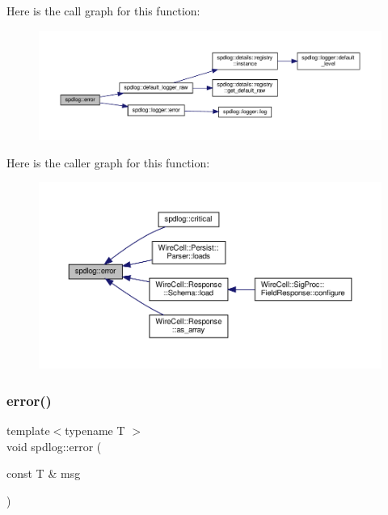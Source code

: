 Here is the call graph for this function\+:
\nopagebreak
\begin{figure}[H]
\begin{center}
\leavevmode
\includegraphics[width=350pt]{namespacespdlog_a84fc1d0e60ec7d333fd4f299f9c1e6b2_cgraph}
\end{center}
\end{figure}
Here is the caller graph for this function\+:
\nopagebreak
\begin{figure}[H]
\begin{center}
\leavevmode
\includegraphics[width=350pt]{namespacespdlog_a84fc1d0e60ec7d333fd4f299f9c1e6b2_icgraph}
\end{center}
\end{figure}
\mbox{\label{namespacespdlog_aa274f8a5f4f20ff435d27500ff589234}} 
\subsubsection{\texorpdfstring{error()}{error()}\hspace{0.1cm}{\footnotesize\ttfamily [2/2]}}
{\footnotesize\ttfamily template$<$typename T $>$ \\
void spdlog\+::error (\begin{DoxyParamCaption}\item[{const T \&}]{msg }\end{DoxyParamCaption})\hspace{0.3cm}{\ttfamily [inline]}}



